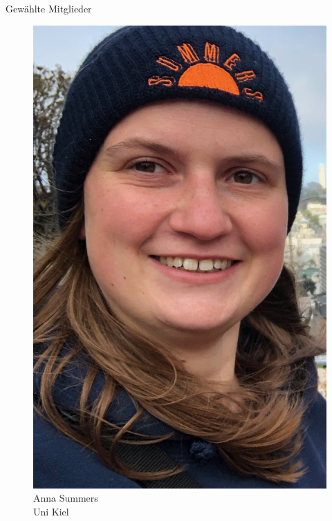 \documentclass[compress, aspectratio=169]{beamer}
\begin{document}
\begin{frame}{Gewählte Mitglieder}
  \vspace{1cm}
  \hspace{0.1\textwidth}
   \begin{minipage}{.28\textwidth}
    \begin{figure}
      \begin{minipage}[r]{.57\textwidth}
        \includegraphics[height=0.3\textheight]{anna.jpeg}
      \end{minipage} \hfill
      \begin{minipage}[l]{.4\textwidth}
        \caption*{Anna Summers \\Uni Kiel}
      \end{minipage}
    \end{figure}

\end{minipage}
\end{frame}
\end{document}
